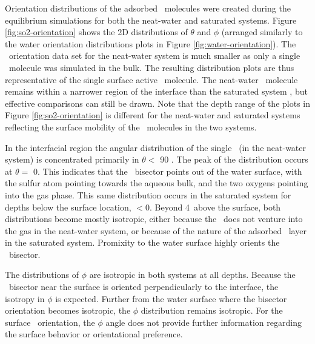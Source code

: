 \documentclass{article}
\begin{document}
Orientation distributions of the adsorbed \suldiox~molecules were created during the equilibrium simulations for both the neat-water and saturated systems. Figure \ref{fig:so2-orientation} shows the 2D distributions of $\theta$ and $\phi$ (arranged similarly to the water orientation distributions plots in Figure \ref{fig:water-orientation}). The \suldiox~orientation data set for the neat-water system is much smaller as only a single \suldiox~molecule was simulated in the bulk. The resulting distribution plots are thus representative of the single surface active \suldiox~molecule. The neat-water \suldiox~molecule remains within a narrower region of the interface than the saturated system \suldiox, but effective comparisons can still be drawn. Note that the depth range of the plots in Figure \ref{fig:so2-orientation} is different for the neat-water and saturated systems reflecting the surface mobility of the \suldiox~molecules in the two systems.

In the interfacial region the angular distribution of the single \suldiox~(in the neat-water system) is concentrated primarily in $\theta <$ 90 \textdegree. The peak of the distribution occurs at $\theta=$ 0\textdegree. This indicates that the \suldiox~bisector points out of the water surface, with the sulfur atom pointing towards the aqueous bulk, and the two oxygens pointing into the gas phase. This same distribution occurs in the saturated system for depths below the surface location, $< 0$\angs. Beyond 4\angs~above the surface, both distributions become mostly isotropic, either because the \suldiox~does not venture into the gas in the neat-water system, or because of the nature of the adsorbed \suldiox~layer in the saturated system. Promixity to the water surface highly orients the \suldiox~bisector. %

The distributions of $\phi$ are isotropic in both systems at all depths. Because the \suldiox~bisector near the surface is oriented perpendicularly to the interface, the isotropy in $\phi$ is expected. Further from the water surface where the bisector orientation becomes isotropic, the $\phi$ distribution remains isotropic. For the surface \suldiox~orientation, the $\phi$ angle does not provide further information regarding the surface behavior or orientational preference.
\end{document}
